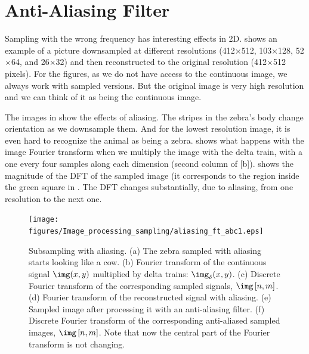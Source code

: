 \section{Anti-Aliasing Filter}

Sampling with the wrong frequency has interesting effects in 2D.  shows an example of a picture downsampled at different resolutions (412$\times$512, 103$\times$128, 52$\times$64, and 26$\times$32) and then reconstructed to the original resolution (412$\times$512 pixels). For the figures, as we do not have access to the continuous image, we always work with sampled versions. But the original image is very high resolution and we can think of it as being the continuous image.


The images in  show the effects of aliasing. The stripes in the zebra's body change orientation as we downsample them. And for the lowest resolution image, it is even hard to recognize the animal as being a zebra.  shows what happens with the image Fourier transform when we multiply the image with the delta train, with a one every four samples along each dimension (second column of \fig{\ref{fig:aliasingFTzebra}}[b]).  shows the magnitude of the DFT of the sampled image (it corresponds to the region inside the green square in . The DFT changes substantially, due to aliasing, from one resolution to the next one.


%
\begin{figure}[t]
\texttt{[image: figures/Image\_processing\_sampling/aliasing\_ft\_abc1.eps]}
\caption{Subsampling with aliasing. (a) The zebra sampled with aliasing starts looking like a cow. (b) Fourier transform of the continuous signal $\img(x,y)$ multiplied by delta trains: $\img_{\delta}(x,y)$. (c) Discrete Fourier transform of the corresponding sampled signals, $\img\left[n,m\right]$. (d) Fourier transform of the reconstructed signal with aliasing. (e) Sampled image after processing it with an anti-aliasing filter. (f) Discrete Fourier transform of the corresponding anti-aliased sampled images, $\img\left[n,m\right]$. Note that now the central part of the Fourier transform is not changing.
} 
\label{fig:aliasingFTzebra}
\end{figure}



